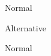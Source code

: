 \documentclass[14pt]{beamer}
\begin{document}
    \begin{frame}
        Normal
    \end{frame}

    \begin{frame}[Alternative]
        Alternative
    \end{frame}

    \begin{frame}
        Normal
    \end{frame}
\end{document}
